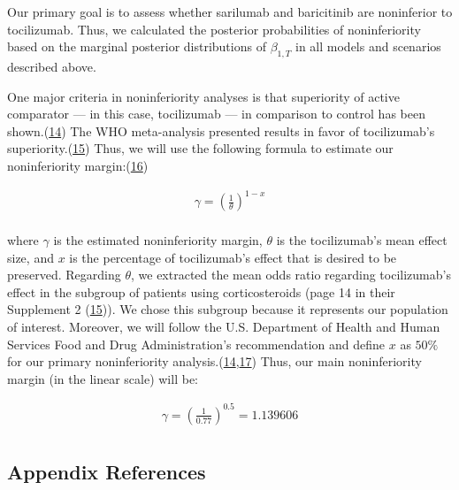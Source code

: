 \documentclass[
  12pt,
]{article}
\begin{document}
Our primary goal is to assess whether sarilumab and baricitinib are
noninferior to tocilizumab. Thus, we calculated the posterior
probabilities of noninferiority based on the marginal posterior
distributions of \(\beta_{1, T}\) in all models and scenarios described
above.

One major criteria in noninferiority analyses is that superiority of
active comparator --- in this case, tocilizumab --- in comparison to
control has been shown.(\protect\hyperlink{ref-tsui2019}{14}) The WHO
meta-analysis presented results in favor of tocilizumab's
superiority.(\protect\hyperlink{ref-whoma}{15}) Thus, we will use the
following formula to estimate our noninferiority
margin:(\protect\hyperlink{ref-trone2020}{16})

\begin{align*}
\gamma =  \left( \frac{1}{\theta} \right)^{1 - x} \\
\end{align*}

where \(\gamma\) is the estimated noninferiority margin, \(\theta\) is
the tocilizumab's mean effect size, and \(x\) is the percentage of
tocilizumab's effect that is desired to be preserved. Regarding
\(\theta\), we extracted the mean odds ratio regarding tocilizumab's
effect in the subgroup of patients using corticosteroids (page 14 in
their Supplement 2 (\protect\hyperlink{ref-whoma}{15})). We chose this
subgroup because it represents our population of interest. Moreover, we
will follow the U.S. Department of Health and Human Services Food and
Drug Administration's recommendation and define \(x\) as \(50\%\) for
our primary noninferiority
analysis.(\protect\hyperlink{ref-tsui2019}{14},\protect\hyperlink{ref-fda}{17})
Thus, our main noninferiority margin (in the linear scale) will be:

\begin{align*}
\gamma =  \left( \frac{1}{0.77} \right)^{0.5} = 1.139606 \\
\end{align*}

\newpage

\hypertarget{appendix-references}{%
\subsection{Appendix References}\label{appendix-references}}
\end{document}

